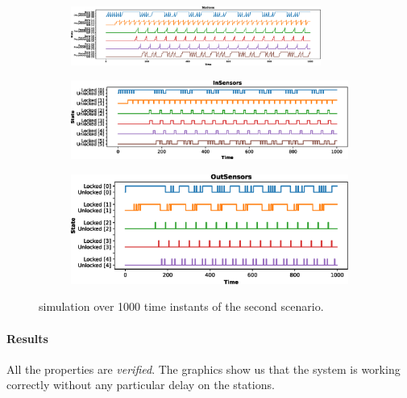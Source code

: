 \documentclass[a4paper]{article}
\begin{document}
    \begin{figure}[h!]
        \begin{subfigure}{\textwidth}
            \centering
            \includegraphics[width=0.9\textwidth]{images/scenarios/scenario2_stations}
        \end{subfigure}
        \begin{subfigure}{0.49\textwidth}
            \centering
            \includegraphics[width=\textwidth]{images/scenarios/scenario2_insensors}
        \end{subfigure}
        \hfill
        \begin{subfigure}{0.49\textwidth}
            \centering
            \includegraphics[width=\textwidth]{images/scenarios/scenario2_outsensors}
        \end{subfigure}
        \caption{simulation over 1000 time instants of the second scenario.}
        \label{figure:scenario:2}
    \end{figure}

    \paragraph{Results} All the properties are \textit{verified}. The graphics show us that the system is working correctly without any particular delay on the stations.
    
\end{document}
